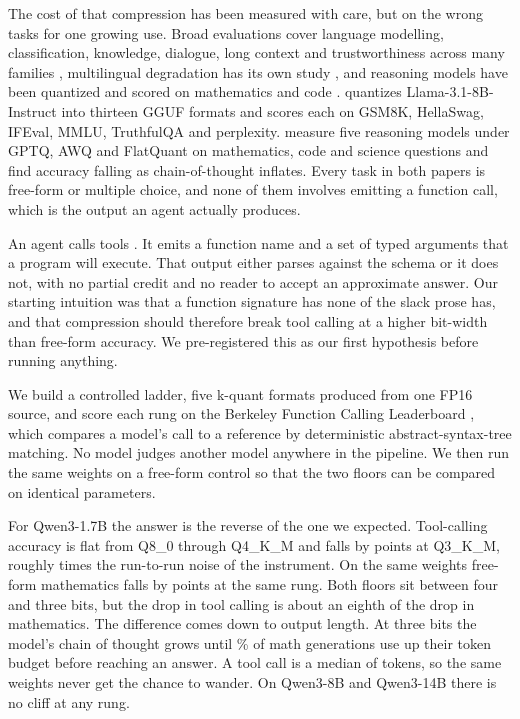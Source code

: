 \documentclass[11pt]{article}
\newcommand{\qm}{Qwen3-1.7B}
\begin{document}
The cost of that compression has been measured with care, but on the wrong tasks for one growing use. Broad evaluations cover language modelling, classification, knowledge, dialogue, long context and trustworthiness across many families \citep{jin2024comprehensive,li2024evaluating}, multilingual degradation has its own study \citep{marchisio2024multilingual}, and reasoning models have been quantized and scored on mathematics and code \citep{liu2025quanthurts}. \citet{kurt2026quant} quantizes Llama-3.1-8B-Instruct into thirteen GGUF formats and scores each on GSM8K, HellaSwag, IFEval, MMLU, TruthfulQA and perplexity. \citet{lotfi2026overthink} measure five reasoning models under GPTQ, AWQ and FlatQuant on mathematics, code and science questions and find accuracy falling as chain-of-thought inflates. Every task in both papers is free-form or multiple choice, and none of them involves emitting a function call, which is the output an agent actually produces.

An agent calls tools \citep{patil2023gorilla,qin2023toolllm,yao2024taubench}. It emits a function name and a set of typed arguments that a program will execute. That output either parses against the schema or it does not, with no partial credit and no reader to accept an approximate answer. Our starting intuition was that a function signature has none of the slack prose has, and that compression should therefore break tool calling at a higher bit-width than free-form accuracy. We pre-registered this as our first hypothesis before running anything.

We build a controlled ladder, five k-quant formats produced from one FP16 source, and score each rung on the Berkeley Function Calling Leaderboard \citep{bfcl2025}, which compares a model's call to a reference by deterministic abstract-syntax-tree matching. No model judges another model anywhere in the pipeline. We then run the same weights on a free-form control so that the two floors can be compared on identical parameters.

For \qm{} the answer is the reverse of the one we expected. Tool-calling accuracy is flat from Q8\_0 through Q4\_K\_M and falls by \qtDropThree{} points at Q3\_K\_M, roughly \qtCliffOverNoise{} times the run-to-run noise of the instrument. On the same weights free-form mathematics falls by \qtGsmDropThree{} points at the same rung. Both floors sit between four and three bits, but the drop in tool calling is about an eighth of the drop in mathematics. The difference comes down to output length. At three bits the model's chain of thought \citep{wei2022cot} grows until \qtGsmTruncPctThree{}\% of math generations use up their token budget before reaching an answer. A tool call is a median of \qtToolNgenMedThree{} tokens, so the same weights never get the chance to wander. On Qwen3-8B and Qwen3-14B there is no cliff at any rung.
\end{document}
